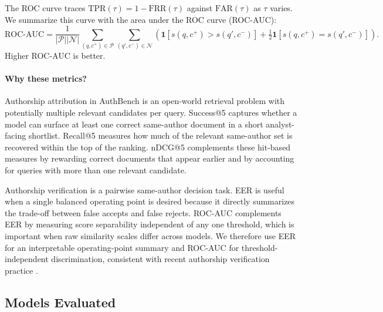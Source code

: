 \documentclass{article}
\newcommand{\ind}[1]{\mathbf{1}\!\left[#1\right]}
\begin{document}
{\color{red}
The ROC curve traces $\mathrm{TPR}(\tau)=1-\mathrm{FRR}(\tau)$ against
$\mathrm{FAR}(\tau)$ as $\tau$ varies. We summarize this curve with the area
under the ROC curve (ROC-AUC):
\[
\mathrm{ROC\mbox{-}AUC} =
\frac{1}{|\mathcal{P}||\mathcal{N}|}
\sum_{(q,c^+)\in\mathcal{P}}
\sum_{(q',c^-)\in\mathcal{N}}
\left(
\ind{s(q,c^+) > s(q',c^-)}
+ \tfrac{1}{2}\ind{s(q,c^+) = s(q',c^-)}
\right).
\]
Higher ROC-AUC is better.

\paragraph{Why these metrics?}
Authorship attribution in AuthBench is an open-world retrieval problem with
potentially multiple relevant candidates per query. Success@5 captures whether
a model can surface at least one correct same-author document in a short
analyst-facing shortlist. Recall@5 measures how much of the relevant
same-author set is recovered within the top of the ranking. nDCG@5 complements
these hit-based measures by rewarding correct documents that appear earlier and
by accounting for queries with more than one relevant candidate.

Authorship verification is a pairwise same-author decision task. EER is useful
when a single balanced operating point is desired because it directly
summarizes the trade-off between false accepts and false rejects. ROC-AUC
complements EER by measuring score separability independent of any one
threshold, which is important when raw similarity scales differ across models.
We therefore use EER for an interpretable operating-point summary and ROC-AUC
for threshold-independent discrimination, consistent with recent authorship
verification practice \citep{pan2022av,pan2023av,wang2023canrep}.
}

\subsection{Models Evaluated}
\label{subsec:models}
\end{document}
